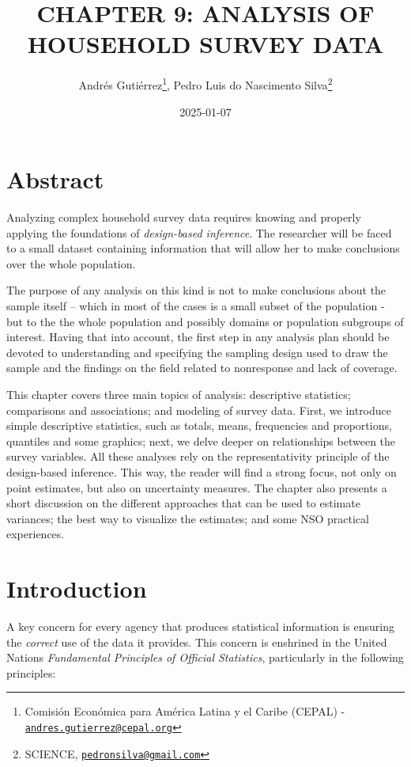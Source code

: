 \documentclass[
  12pt,
]{book}
\title{CHAPTER 9: ANALYSIS OF HOUSEHOLD SURVEY DATA}
\author{Andrés Gutiérrez\footnote{Comisión Económica para América Latina y el Caribe (CEPAL) - \href{mailto:andres.gutierrez@cepal.org}{\nolinkurl{andres.gutierrez@cepal.org}}}, Pedro Luis do Nascimento Silva\footnote{SCIENCE, \href{mailto:pedronsilva@gmail.com}{\nolinkurl{pedronsilva@gmail.com}}}}
\date{2025-01-07}
\begin{document}
\maketitle

{
\hypersetup{linkcolor=}
\setcounter{tocdepth}{0}
\tableofcontents
}
\listoffigures
\listoftables
\hypertarget{abstract}{%
\chapter*{Abstract}\label{abstract}}

Analyzing complex household survey data requires knowing and properly applying the foundations of \emph{design-based inference}. The researcher will be faced to a small dataset containing information that will allow her to make conclusions over the whole population.

The purpose of any analysis on this kind is not to make conclusions about the sample itself -- which in most of the cases is a small subset of the population - but to the the whole population and possibly domains or population subgroups of interest. Having that into account, the first step in any analysis plan should be devoted to understanding and specifying the sampling design used to draw the sample and the findings on the field related to nonresponse and lack of coverage.

This chapter covers three main topics of analysis: descriptive statistics; comparisons and associations; and modeling of survey data. First, we introduce simple descriptive statistics, such as totals, means, frequencies and proportions, quantiles and some graphics; next, we delve deeper on relationships between the survey variables. All these analyses rely on the representativity principle of the design-based inference. This way, the reader will find a strong focus, not only on point estimates, but also on uncertainty measures. The chapter also presents a short discussion on the different approaches that can be used to estimate variances; the best way to visualize the estimates; and some NSO practical experiences.

\hypertarget{introduction}{%
\chapter*{Introduction}\label{introduction}}

A key concern for every agency that produces statistical information is ensuring the \emph{correct} use of the data it provides. This concern is enshrined in the United Nations \emph{Fundamental Principles of Official Statistics}, particularly in the following principles:
\end{document}
